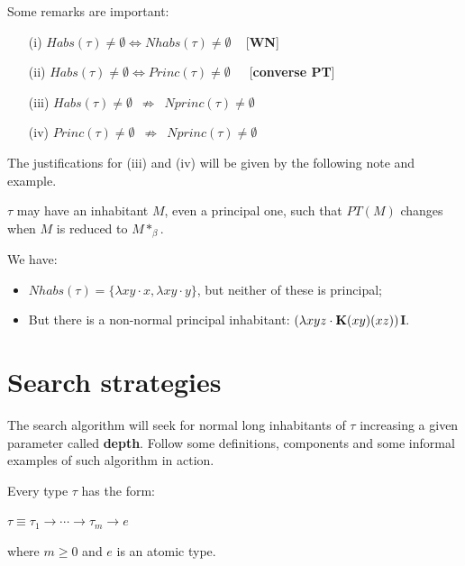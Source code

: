 \documentclass[a4paper,10pt]{article}
\begin{document}
\begin{remark}\label{8A13} Some remarks are important:

 \begin{itemize}
  \item [(i)] $Habs(\tau) \neq \emptyset \Longleftrightarrow Nhabs(\tau) \neq \emptyset\,\,\,\,\,$ [\textbf{WN}]
  \item [(ii)] $Habs(\tau) \neq \emptyset \Longleftrightarrow Princ(\tau) \neq \emptyset\,\,\,\,\,\,\,$ [\textbf{converse PT}]
  \item [(iii)] $Habs(\tau) \neq \emptyset \,\,\,\nRightarrow \,\,\,Nprinc(\tau) \neq \emptyset$
  \item [(iv)] $Princ(\tau) \neq \emptyset \,\,\,\nRightarrow \,\,\, Nprinc(\tau) \neq \emptyset$
 \end{itemize}
\end{remark}

The justifications for (iii) and (iv) will be given by the following note and example.
 
\begin{note}
 $\tau$ may have an inhabitant $M$, even a principal one, such that $PT(M)$ changes when $M$ is reduced to $M*_{\beta}$. 
\end{note}

\begin{exa} We have:
\begin{itemize}
 \item $Nhabs(\tau) = \{\lambda xy \cdot x, \lambda xy \cdot y\}$, but neither of these is principal;
 \item But there is a non-normal principal inhabitant: $(\lambda xyz \cdot \mbox{\textbf{K}}(xy)(xz))$\textbf{I}.
\end{itemize}
\end{exa}

\section{Search strategies}

The search algorithm will seek for normal long inhabitants of $\tau$ increasing a given parameter called \textbf{depth}.  
Follow some definitions, components and some informal examples of such algorithm in action.


\begin{lem}
   Every type $\tau$ has the form:

   \begin{center}
         $\tau \equiv \tau_1 \rightarrow \cdots \rightarrow \tau_m \rightarrow e$
   \end{center}
   where $m \geq 0$ and $e$ is an atomic type.
\end{lem}
\end{document}

